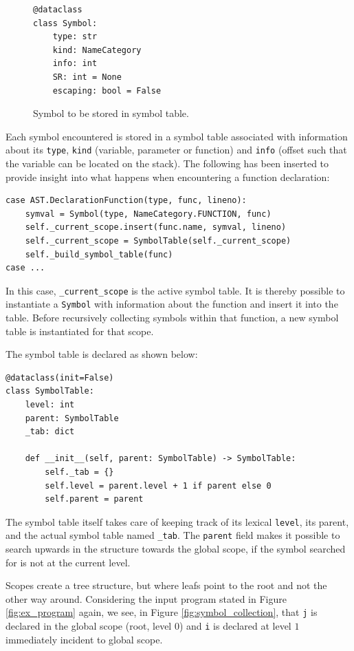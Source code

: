 \begin{figure}[H]
\begin{verbatim}
@dataclass
class Symbol:
    type: str
    kind: NameCategory
    info: int
    SR: int = None
    escaping: bool = False
\end{verbatim}
    \caption{Symbol to be stored in symbol table.}
    \label{fig:symbol}
\end{figure}

Each symbol encountered is stored in a symbol table associated with information about its \texttt{type}, \texttt{kind} (variable, parameter or function) and \texttt{info} (offset such that the variable can be located on the stack). The following has been inserted to provide insight into what happens when encountering a function declaration:

\begin{verbatim}
case AST.DeclarationFunction(type, func, lineno):
    symval = Symbol(type, NameCategory.FUNCTION, func)
    self._current_scope.insert(func.name, symval, lineno)
    self._current_scope = SymbolTable(self._current_scope)
    self._build_symbol_table(func)
case ...
\end{verbatim}

In this case, \texttt{\_current\_scope} is the active symbol table. It is thereby possible to instantiate a \texttt{Symbol} with information about the function and insert it into the table. Before recursively collecting symbols within that function, a new symbol table is instantiated for that scope.

The symbol table is declared as shown below:

\begin{verbatim}
@dataclass(init=False)
class SymbolTable:
    level: int
    parent: SymbolTable
    _tab: dict

    def __init__(self, parent: SymbolTable) -> SymbolTable:
        self._tab = {}
        self.level = parent.level + 1 if parent else 0
        self.parent = parent
\end{verbatim}

The symbol table itself takes care of keeping track of its lexical \texttt{level}, its parent, and the actual symbol table named \texttt{\_tab}. The \texttt{parent} field makes it possible to search upwards in the structure towards the global scope, if the symbol searched for is not at the current level.

Scopes create a tree structure, but where leafs point to the root and not the other way around. Considering the input program stated in Figure \ref{fig:ex_program} again, we see, in Figure \ref{fig:symbol_collection}, that \texttt{j} is declared in the global scope (root, level $0$) and \texttt{i} is declared at level $1$ immediately incident to global scope. 

